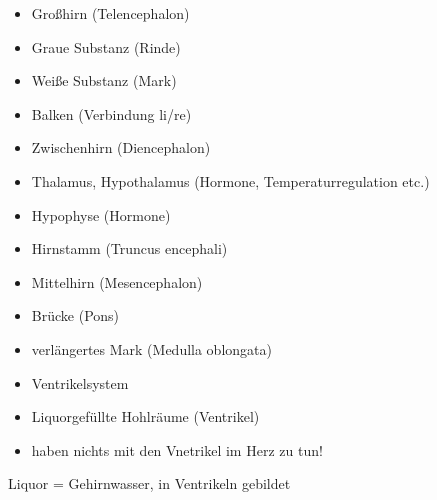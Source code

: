 \documentclass{article}
\begin{document}
\begin{itemize}
\item {\mdseries
Gro{\ss}hirn (Telencephalon)}

\end{itemize}
\begin{itemize}
\item {\mdseries
{}Graue Substanz (Rinde)}

\item {\mdseries
{}Wei{\ss}e Substanz (Mark)}

\item {\mdseries
Balken (Verbindung li/re)}

\end{itemize}
\begin{itemize}
\item {\mdseries
Zwischenhirn  (Diencephalon)}

\end{itemize}
\begin{itemize}
\item {\mdseries
Thalamus, Hypothalamus (Hormone, Temperaturregulation etc.)}

\item {\mdseries
Hypophyse (Hormone)}

\end{itemize}
\begin{itemize}
\item {\mdseries
Hirnstamm (Truncus encephali)}

\item {\mdseries
Mittelhirn (Mesencephalon)}

\item {\mdseries
Br\"ucke (Pons)}

\item {\mdseries
verl\"angertes Mark (Medulla oblongata)}

\item {\mdseries
Ventrikelsystem}

\end{itemize}
\begin{itemize}
\item {\mdseries
Liquorgef\"ullte Hohlr\"aume (Ventrikel)}

\item {\mdseries
haben nichts mit den Vnetrikel im Herz zu tun!}

\end{itemize}
{\mdseries
Liquor = Gehirnwasser, in Ventrikeln gebildet}
\end{document}
